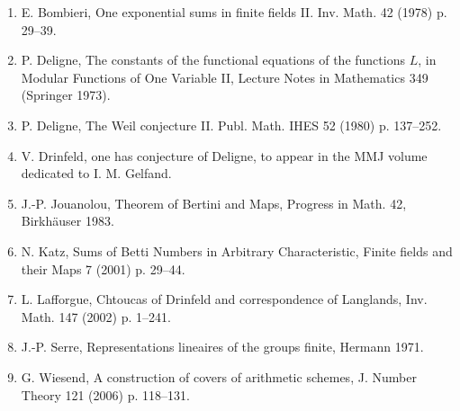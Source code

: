 \documentclass[11pt,a4paper]{article}
\theoremstyle{plain}
\theoremstyle{definition}
\begin{document}
\begin{enumerate}
\item[{[B]}] E. Bombieri, One exponential sums in finite fields II. Inv. Math. 42 (1978) p. 29--39.

\item[{[De1]}] P. Deligne, The constants of the functional equations of the functions $L$, in Modular Functions of One Variable II, Lecture Notes in Mathematics 349 (Springer 1973).

\item[{[De2]}] P. Deligne, The Weil conjecture II. Publ. Math. IHES 52 (1980) p. 137--252.

\item[{[Dr]}] V. Drinfeld, one has conjecture of Deligne, to appear in the MMJ volume dedicated to I. M. Gelfand.

\item[{[J]}] J.-P. Jouanolou, Theorem of Bertini and Maps, Progress in Math. 42, Birkh\"auser 1983.

\item[{[K]}] N. Katz, Sums of Betti Numbers in Arbitrary Characteristic, Finite fields and their Maps 7 (2001) p. 29--44.

\item[{[L]}] L. Lafforgue, Chtoucas of Drinfeld and correspondence of Langlands, Inv. Math. 147 (2002) p. 1--241.

\item[{[S]}] J.-P. Serre, Representations lineaires of the groups finite, Hermann 1971.

\item[{[W]}] G. Wiesend, A construction of covers of arithmetic schemes, J. Number Theory 121 (2006) p. 118--131.
\end{enumerate}
\end{document}
